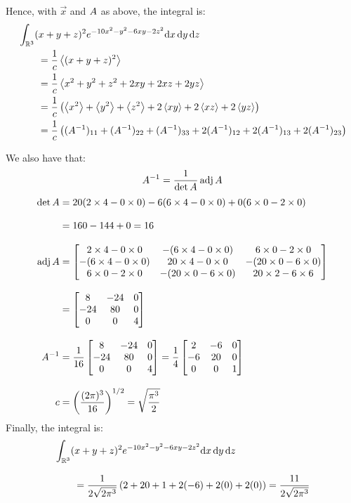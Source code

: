 Hence, with $\vec{x}$ and ${A}$ as above, the integral is:
\begin{align}
   & \int_{\mathbb{R}^3} (x + y + z)^2 e^{-10x^2 - y^2 - 6xy - 2z^2} \text{d}{}{x}\,\text{d}{}{y}\,\text{d}{}{z}
  \nonumber
  \\
   & \qquad =
  \frac{1}{c}\left\langle{(x + y + z)^2}\right\rangle
  \nonumber
  \\
   & \qquad =
  \frac{1}{c}\left\langle{x^2 + y^2 + z^2 + 2xy + 2xz + 2yz}\right\rangle
  \nonumber
  \\
   & \qquad =
  \frac{1}{c}\left(\left\langle{x^2}\right\rangle + \left\langle{y^2}\right\rangle + \left\langle{z^2}\right\rangle + 2\left\langle{xy}\right\rangle + 2\left\langle{xz}\right\rangle + 2\left\langle{yz}\right\rangle\right)
  \nonumber
  \\
   & \qquad =
  \frac{1}{c}\left((A^{-1})_{11} + (A^{-1})_{22} + (A^{-1})_{33} + 2(A^{-1})_{12} + 2(A^{-1})_{13} + 2(A^{-1})_{23}\right)
\end{align}

We also have that:
\begin{equation}
  {A}^{-1} = \frac{1}{\det{A}}\operatorname{\text{adj}}{A}
\end{equation}
\begin{align*}
  \det{A}
    & =
  20 (2 \times 4 - 0 \times 0) - 6 (6 \times 4 - 0 \times 0) + 0 (6 \times 0 - 2 \times 0)
  \\[2ex]
    & = 160 - 144 + 0 = 16
  \\[2ex]
  \operatorname{\text{adj}}{A}
    & =
  \begin{bmatrix}
    2 \times 4 - 0 \times 0    & -(6 \times 4 - 0 \times 0)  & 6 \times 0 - 2 \times 0
    \\
    -(6 \times 4 - 0 \times 0) & 20 \times 4 - 0 \times 0    & -(20 \times 0 - 6 \times 0)
    \\
    6 \times 0 - 2 \times 0    & -(20 \times 0 - 6 \times 0) & 20 \times 2 - 6 \times 6
  \end{bmatrix}
  \\[2ex]
    & =
  \begin{bmatrix}
    8   & -24 & 0
    \\
    -24 & 80  & 0
    \\
    0   & 0   & 4
  \end{bmatrix}
  \\[2ex]
  {A}^{-1}
    & = \frac{1}{16}
  \begin{bmatrix}
    8   & -24 & 0
    \\
    -24 & 80  & 0
    \\
    0   & 0   & 4
  \end{bmatrix}
  = \frac{1}{4}
  \begin{bmatrix}
    2  & -6 & 0
    \\
    -6 & 20 & 0
    \\
    0  & 0  & 1
  \end{bmatrix}
  \\[2ex]
  c & =
  \left(\frac{(2\pi)^3}{16}\right)^{1/2} = \sqrt{\frac{\pi^3}{2}}
\end{align*}
Finally, the integral is:
\begin{align*}
   & \int_{\mathbb{R}^3} (x + y + z)^2 e^{-10x^2 - y^2 - 6xy - 2z^2} \text{d}{}{x}\,\text{d}{}{y}\,\text{d}{}{z}
  \\[2ex]
   & \qquad =
  \frac{1}{2 \sqrt{2\pi^3}} \left(2 + 20 + 1 + 2(-6) + 2(0) + 2(0)\right)
  =
  \frac{11}{2 \sqrt{2\pi^3}}
\end{align*}

